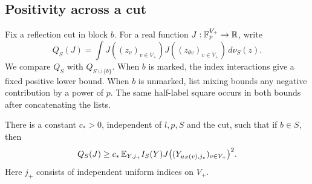 \subsection{Positivity across a cut}

Fix a reflection cut in block $b$.  For a real function
$J:\mathbb F_p^{V_+}\to\mathbb R$, write
\[
 Q_S(J)=\int J((z_v)_{v\in V_+})
                 J((z_{\theta v})_{v\in V_+})\,d\nu_S(z).
\]
We compare $Q_S$ with $Q_{S\cup\{b\}}$.  When $b$ is marked,
the index interactions give a fixed positive lower bound.  When $b$
is unmarked, list mixing bounds any negative contribution by a power
of $p$.  The same half-label square occurs in both bounds after
concatenating the lists.

\begin{lemma}
\label{tuple:marked-positive}
There is a constant $c_*>0$, independent of $l,p,S$ and the cut, such
that if $b\in S$, then
\begin{equation}
 Q_S(J)\ge c_*\,
 \mathbb E_{Y,j_+} I_S(Y)
       J\bigl((Y_{u_S(v),j_v})_{v\in V_+}\bigr)^2.
 \label{eq:4}
\end{equation}
Here $j_+$ consists of independent uniform indices on $V_+$.
\end{lemma}

